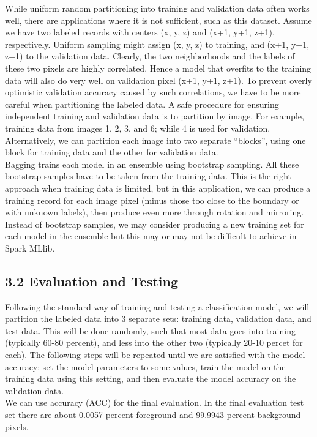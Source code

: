 \documentclass{neu_handout}
\begin{document}
While uniform random partitioning into training and validation data often works well, there are
applications where it is not sufficient, such as this dataset. Assume we have two labeled
records with centers (x, y, z) and (x+1, y+1, z+1), respectively. Uniform sampling might assign (x, y, z) to
training, and (x+1, y+1, z+1) to the validation data. Clearly, the two neighborhoods and the labels of
these two pixels are highly correlated. Hence a model that overfits to the training data will also do very
well on validation pixel (x+1, y+1, z+1). To prevent overly optimistic validation accuracy caused by such
correlations, we have to be more careful when partitioning the labeled data. A safe procedure for 
ensuring independent training and validation data is to partition by image. For example, training data from images 1, 2, 3, and 6; while 4 is used for validation. Alternatively, we can partition each
image into two separate “blocks”, using one block for training data and the other for validation data.\\

Bagging trains each model in an ensemble using bootstrap sampling. All these bootstrap samples have to be taken from the training data. This is the right approach when training data is limited, but in this application, we can produce a training record for each image pixel (minus those too close to the boundary or with unknown labels), then produce even more through rotation and mirroring. Instead of bootstrap samples, we may consider producing a new training set for each model in the ensemble but this may or may not be difficult to achieve in Spark MLlib.

\subsection*{3.2 Evaluation and Testing}
Following the standard way of training and testing a classification model, we will partition the labeled data into 3 separate sets: training data, validation data, and test data. This will be done randomly, such that most data goes into training (typically 60-80 percent), and less into the
other two (typically 20-10 percet for each). The following steps will be repeated until we are satisfied with the model accuracy: set the model parameters to some values, train the model on the training data using this setting, and then evaluate the model accuracy on the validation data.\\

We can use accuracy (ACC) for the final evaluation. In the final evaluation test set there are about 0.0057 percent foreground and 99.9943 percent background pixels.\\
\end{document}

